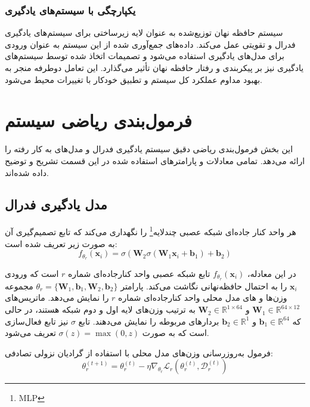 \documentclass[11pt]{article}
\begin{document}
\subsubsection{یکپارچگی با سیستم‌های یادگیری}

سیستم حافظه نهان توزیع‌شده به عنوان لایه زیرساختی برای سیستم‌های یادگیری فدرال و تقویتی عمل می‌کند. داده‌های جمع‌آوری شده از این سیستم به عنوان ورودی برای مدل‌های یادگیری استفاده می‌شود و تصمیمات اتخاذ شده توسط سیستم‌های یادگیری نیز بر پیکربندی و رفتار حافظه نهان تأثیر می‌گذارد. این تعامل دوطرفه منجر به بهبود مداوم عملکرد کل سیستم و تطبیق خودکار با تغییرات محیط می‌شود.

\section{فرمول‌بندی ریاضی سیستم}

این بخش فرمول‌بندی ریاضی دقیق سیستم یادگیری فدرال و مدل‌های به کار رفته را ارائه می‌دهد. تمامی معادلات و پارامترهای استفاده شده در این قسمت تشریح و توضیح داده شده‌اند.

\subsection{مدل یادگیری فدرال}

هر واحد کنار جاده‌ای شبکه عصبی چندلایه\footnote{MLP} را نگهداری می‌کند که تابع تصمیم‌گیری آن به صورت زیر تعریف شده است:
\begin{equation}
f_{\theta_r}(\mathbf{x}_i) = \sigma(\mathbf{W}_2 \sigma(\mathbf{W}_1 \mathbf{x}_i + \mathbf{b}_1) + \mathbf{b}_2)
\label{eq:mlp_model}
\end{equation}

در این معادله، $f_{\theta_r}(\mathbf{x}_i)$ تابع شبکه عصبی واحد کنارجاده‌ای شماره $r$ است که ورودی $\mathbf{x}_i$ را به احتمال حافظه‌نهانی نگاشت می‌کند. پارامتر $\theta_r = \{\mathbf{W}_1, \mathbf{b}_1, \mathbf{W}_2, \mathbf{b}_2\}$ مجموعه وزن‌ها و  های مدل محلی واحد کنارجاده‌ای شماره $r$ را نمایش می‌دهد. ماتریس‌های $\mathbf{W}_1 \in \mathbb{R}^{64 \times 12}$ و $\mathbf{W}_2 \in \mathbb{R}^{1 \times 64}$ به ترتیب وزن‌های لایه اول و دوم شبکه هستند، در حالی که $\mathbf{b}_1 \in \mathbb{R}^{64}$ و $\mathbf{b}_2 \in \mathbb{R}^{1}$ بردارهای  مربوطه را نمایش می‌دهند. تابع $\sigma$ نیز تابع فعال‌سازی  است که به صورت $\sigma(z) = \max(0, z)$ تعریف می‌شود.

فرمول به‌روزرسانی وزن‌های مدل محلی با استفاده از گرادیان نزولی تصادفی:
\begin{equation}
\theta_r^{(t+1)} = \theta_r^{(t)} - \eta \nabla_{\theta_r} \mathcal{L}_r(\theta_r^{(t)}, \mathcal{D}_r^{(t)})
\label{eq:local_update}
\end{equation}
\end{document}
